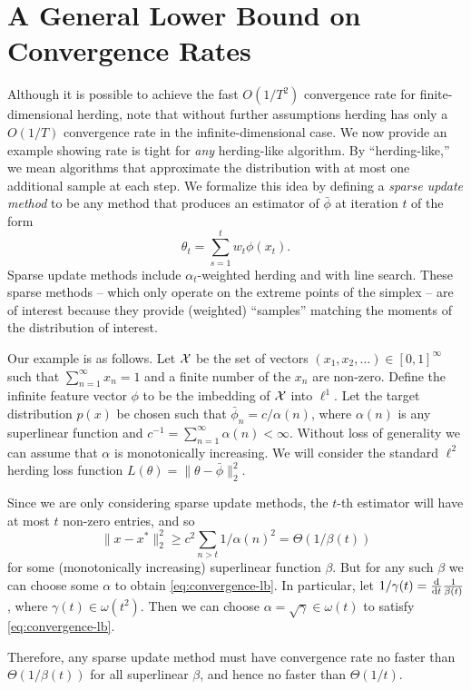 \documentclass[paper.tex]{subfiles}
\begin{document}
\section{A General Lower Bound on Convergence Rates}
\label{sec:lower-bounds}

Although it is possible to achieve the fast $O(1/T^{2})$ convergence rate for finite-dimensional herding, \citet{Bach:2012a} note that without further assumptions herding has only a $O(1/T)$ convergence rate in the infinite-dimensional case. We now provide an example showing rate is tight for {\em any} herding-like algorithm.  By ``herding-like,'' we mean algorithms that approximate the distribution with at most one additional sample at each step. We formalize this idea by defining a {\em sparse update method} to be any method that produces an estimator of $\bar \phi$ at iteration $t$ of the form 
\[
\theta_{t} = \sum_{s =1}^{t}w_{t} \phi(x_{t}).
\]
Sparse update methods include $\alpha_{t}$-weighted herding and \cgd with line search. These sparse methods -- which only operate on the extreme points of the simplex -- are of interest because they provide (weighted) ``samples'' matching the moments of the distribution of interest. 

Our example is as follows. Let $\mathcal{X}$ be the set of vectors $(x_{1},x_{2},\dots) \in [0,1]^{\infty}$ such that $\sum_{n=1}^{\infty} x_{n} = 1$ and a finite number of the $x_{n}$ are non-zero. Define the infinite feature vector $\phi$ to be the imbedding of $\mathcal{X}$ into $\ell^{1}$. Let the target distribution $p(x)$ be chosen such that $\bar\phi_{n} = c/\alpha(n)$, where $\alpha(n)$ is any superlinear function and $c^{-1} = \sum_{n=1}^{\infty} \alpha(n) < \infty$. Without loss of generality we can assume that $\alpha$ is monotonically increasing. We will consider the standard $\ell^{2}$ herding loss function $L(\theta) = \|\theta - \bar \phi\|_2^2$. 

Since we are only considering sparse update methods, the $t$-th estimator will have at most $t$ non-zero entries, and so 
\[
\|x-x^{*}\|_2^2 \ge c^{2}\sum_{n > t} 1/\alpha(n)^{2} = \Theta(1/\beta(t)) \label{eq:convergence-lb}
\]
for some (monotonically increasing) superlinear function $\beta$. But for any such $\beta$ we can choose some $\alpha$ to obtain \eqref{eq:convergence-lb}. In particular, let $1/\gamma(t) = \frac{\mathrm{d}}{\mathrm{d} t}\frac{1}{\beta(t)}$, where $\gamma(t) \in \omega(t^{2})$. Then we can choose $\alpha = \sqrt \gamma \in \omega(t)$ to satisfy \eqref{eq:convergence-lb}. 

Therefore, any sparse update method must have convergence rate no faster than $\Theta(1/\beta(t))$ for all superlinear $\beta$, and hence no faster than $\Theta(1/t)$. 
\end{document}
